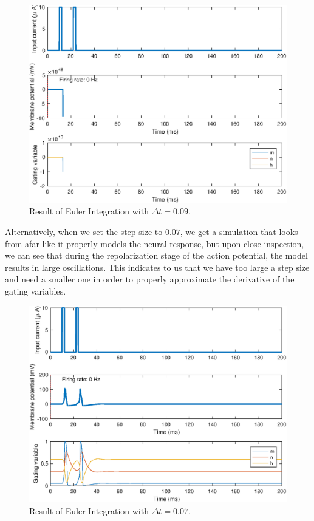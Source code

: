 \documentclass[11pt, oneside]{article}
\begin{document}
\begin{figure}[ht!]
\centering
\includegraphics[width=1\textwidth]{simulate_hh_dt_9.eps}
\caption{Result of Euler Integration with $\Delta t = 0.09$.}
\label{fig:euler_integration_nine}
\end{figure}

Alternatively, when we set the step size to $0.07$, we get a simulation that looks from afar like it properly models the neural response, but upon close inspection, we can see that during the repolarization stage of the action potential, the model results in large oscillations. This indicates to us that we have too large a step size and need a smaller one in order to properly approximate the derivative of the gating variables.

\begin{figure}[ht!]
\centering
\includegraphics[width=1\textwidth]{simulate_hh_dt_7.eps}
\caption{Result of Euler Integration with $\Delta t = 0.07$.}
\label{fig:euler_integration_seven}
\end{figure}
\end{document}
